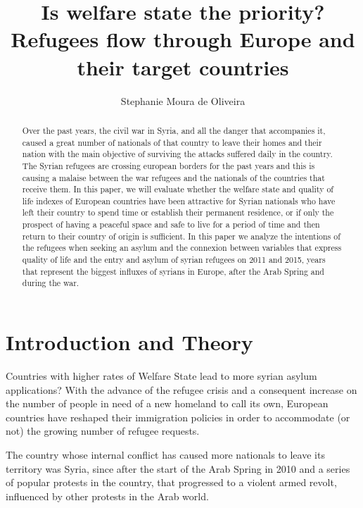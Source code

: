 \documentclass[]{elsarticle} %
\begin{document}
\begin{frontmatter}

  \title{Is welfare state the priority? Refugees flow through Europe and their
target countries}
    \author[Universidade Federal de Pernambuco - UFPE]{Stephanie Moura de Oliveira}
      \address[Universidade Federal de Pernambuco - UFPE]{Universidade Federal de Pernambuco}
  
  \begin{abstract}
  Over the past years, the civil war in Syria, and all the danger that
  accompanies it, caused a great number of nationals of that country to
  leave their homes and their nation with the main objective of surviving
  the attacks suffered daily in the country. The Syrian refugees are
  crossing european borders for the past years and this is causing a
  malaise between the war refugees and the nationals of the countries that
  receive them. In this paper, we will evaluate whether the welfare state
  and quality of life indexes of European countries have been attractive
  for Syrian nationals who have left their country to spend time or
  establish their permanent residence, or if only the prospect of having a
  peaceful space and safe to live for a period of time and then return to
  their country of origin is sufficient. In this paper we analyze the
  intentions of the refugees when seeking an asylum and the connexion
  between variables that express quality of life and the entry and asylum
  of syrian refugees on 2011 and 2015, years that represent the biggest
  influxes of syrians in Europe, after the Arab Spring and during the war.
  \end{abstract}
  
 \end{frontmatter}

\section{Introduction and Theory}\label{introduction-and-theory}

Countries with higher rates of Welfare State lead to more syrian asylum
applications? With the advance of the refugee crisis and a consequent
increase on the number of people in need of a new homeland to call its
own, European countries have reshaped their immigration policies in
order to accommodate (or not) the growing number of refugee requests.

The country whose internal conflict has caused more nationals to leave
its territory was Syria, since after the start of the Arab Spring in
2010 and a series of popular protests in the country, that progressed to
a violent armed revolt, influenced by other protests in the Arab world.
\end{document}
